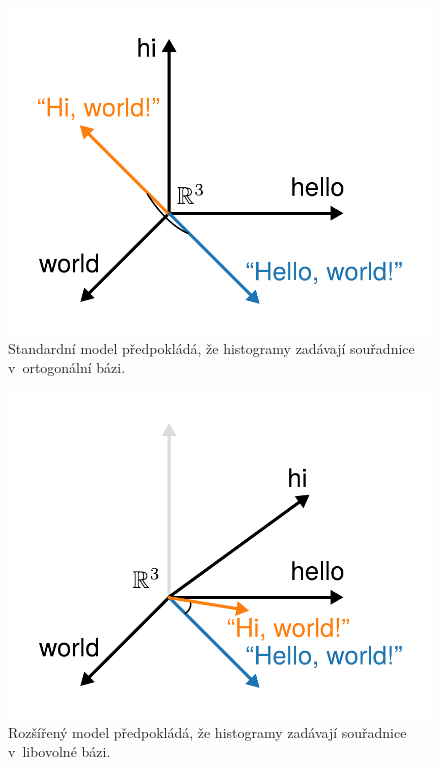 \documentclass[aspectratio=169,t]{beamer}
\begin{document}
\begin{frame}[c]
\begin{figure}
\vfill
\begin{center}
\includegraphics[scale=0.6]{figs/cosine}
\end{center}
\caption{Standardní model předpokládá, že histogramy zadávají souřadnice
  v~ortogonální bázi.}
\end{figure}
\end{frame}


\begin{frame}[c]
\begin{figure}
\vfill
\begin{center}
\includegraphics[scale=0.6]{figs/soft-cosine}
\end{center}
\caption{Rozšířený model předpokládá, že histogramy zadávají souřadnice
  v~libovolné bázi.}
\end{figure}
\end{frame}
\end{document}
